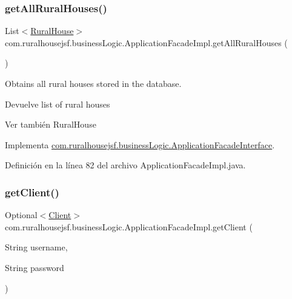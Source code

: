 \subsubsection{\texorpdfstring{getAllRuralHouses()}{getAllRuralHouses()}}
{\footnotesize\ttfamily List$<$\mbox{\hyperlink{classcom_1_1ruralhousejsf_1_1domain_1_1_rural_house}{Rural\+House}}$>$ com.\+ruralhousejsf.\+business\+Logic.\+Application\+Facade\+Impl.\+get\+All\+Rural\+Houses (\begin{DoxyParamCaption}{ }\end{DoxyParamCaption})}

Obtains all rural houses stored in the database.

\begin{DoxyReturn}{Devuelve}
list of rural houses
\end{DoxyReturn}
\begin{DoxySeeAlso}{Ver también}
Rural\+House 
\end{DoxySeeAlso}


Implementa \mbox{\hyperlink{interfacecom_1_1ruralhousejsf_1_1business_logic_1_1_application_facade_interface_aba85657d1479d51b7bf1bd17d66d0513}{com.\+ruralhousejsf.\+business\+Logic.\+Application\+Facade\+Interface}}.



Definición en la línea 82 del archivo Application\+Facade\+Impl.\+java.

\mbox{\label{classcom_1_1ruralhousejsf_1_1business_logic_1_1_application_facade_impl_a249a902aa3507a04fb15ab5fcf1f082c}} 
\subsubsection{\texorpdfstring{getClient()}{getClient()}}
{\footnotesize\ttfamily Optional$<$\mbox{\hyperlink{classcom_1_1ruralhousejsf_1_1domain_1_1_client}{Client}}$>$ com.\+ruralhousejsf.\+business\+Logic.\+Application\+Facade\+Impl.\+get\+Client (\begin{DoxyParamCaption}\item[{String}]{username,  }\item[{String}]{password }\end{DoxyParamCaption})}


